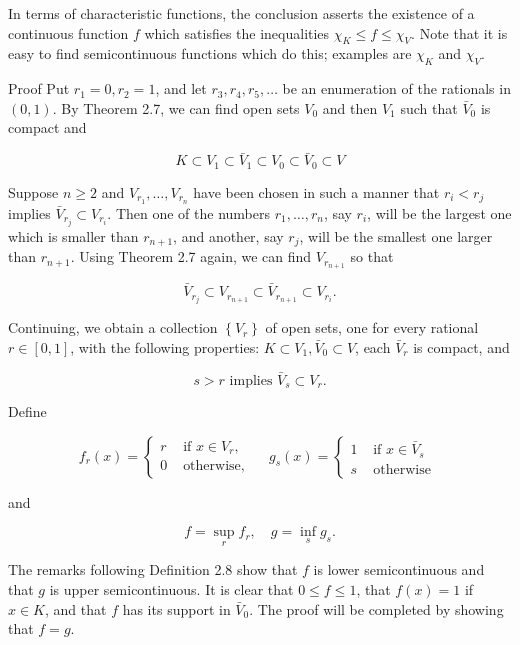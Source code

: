 \documentclass[10pt]{article}
\begin{document}
In terms of characteristic functions, the conclusion asserts the existence of a continuous function $f$ which satisfies the inequalities $\chi_{K} \leq f \leq \chi_{V}$. Note that it is easy to find semicontinuous functions which do this; examples are $\chi_{K}$ and $\chi_{V}$.

Proof Put $r_{1}=0, r_{2}=1$, and let $r_{3}, r_{4}, r_{5}, \ldots$ be an enumeration of the rationals in $(0,1)$. By Theorem 2.7, we can find open sets $V_{0}$ and then $V_{1}$ such that $\bar{V}_{0}$ is compact and

$$
K \subset V_{1} \subset \bar{V}_{1} \subset V_{0} \subset \bar{V}_{0} \subset V
$$

Suppose $n \geq 2$ and $V_{r_{1}}, \ldots, V_{r_{n}}$ have been chosen in such a manner that $r_{i}<r_{j}$ implies $\bar{V}_{r_{j}} \subset V_{r_{i}}$. Then one of the numbers $r_{1}, \ldots, r_{n}$, say $r_{i}$, will be the largest one which is smaller than $r_{n+1}$, and another, say $r_{j}$, will be the smallest one larger than $r_{n+1}$. Using Theorem 2.7 again, we can find $V_{r_{n+1}}$ so that

$$
\bar{V}_{r_{j}} \subset V_{r_{n+1}} \subset \bar{V}_{r_{n+1}} \subset V_{r_{i}} .
$$

Continuing, we obtain a collection $\left\{V_{r}\right\}$ of open sets, one for every rational $r \in[0,1]$, with the following properties: $K \subset V_{1}, \bar{V}_{0} \subset V$, each $\bar{V}_{r}$ is compact, and

$$
s>r \text { implies } \bar{V}_{s} \subset V_{r} .
$$

Define

$$
f_{r}(x)=\left\{\begin{array}{ll}
r & \text { if } x \in V_{r}, \\
0 & \text { otherwise, }
\end{array} \quad g_{s}(x)= \begin{cases}1 & \text { if } x \in \bar{V}_{s} \\
s & \text { otherwise }\end{cases}\right.
$$

and

$$
f=\sup _{r} f_{r}, \quad g=\inf _{s} g_{s} .
$$

The remarks following Definition 2.8 show that $f$ is lower semicontinuous and that $g$ is upper semicontinuous. It is clear that $0 \leq f \leq 1$, that
$f(x)=1$ if $x \in K$, and that $f$ has its support in $\bar{V}_{0}$. The proof will be completed by showing that $f=g$.
\end{document}
